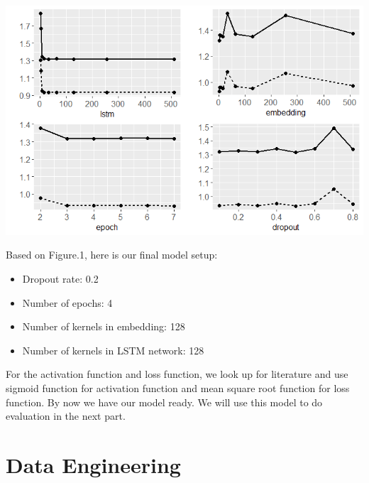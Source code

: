 \documentclass[letterpaper]{article} %
\begin{document}
\begin{center}
  \includegraphics[width=\columnwidth]{../Plots/lstm_parameters.png}
\end{center}

Based on Figure.1, here is our final model setup:
\begin{itemize}
\item Dropout rate: 0.2
\item Number of epochs: 4
\item Number of kernels in embedding: 128
\item Number of kernels in LSTM network: 128
\end{itemize}
For the activation function and loss function, we look up for literature and use sigmoid function for activation function and mean square root function for loss function.
By now we have our model ready. We will use this model to do evaluation in the next part.

\section{Data Engineering}
\end{document}
